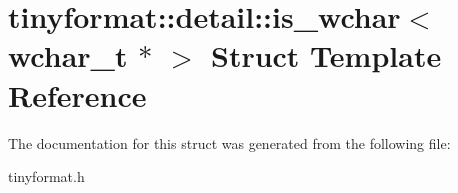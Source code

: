 \hypertarget{structtinyformat_1_1detail_1_1is__wchar_3_01wchar__t_01_5_01_4}{}\section{tinyformat\+:\+:detail\+:\+:is\+\_\+wchar$<$ wchar\+\_\+t $\ast$ $>$ Struct Template Reference}
\label{structtinyformat_1_1detail_1_1is__wchar_3_01wchar__t_01_5_01_4}


The documentation for this struct was generated from the following file\+:\begin{DoxyCompactItemize}
\item 
tinyformat.\+h\end{DoxyCompactItemize}
